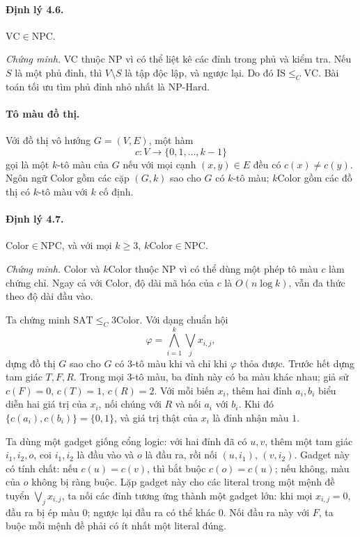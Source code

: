 \documentclass[11pt]{article}
\begin{document}
\paragraph{Định lý 4.6.}
\(\mathrm{VC}\in\mathrm{NPC}\).

\emph{Chứng minh.}
VC thuộc NP vì có thể liệt kê các đỉnh trong phủ và kiểm tra. Nếu \(S\) là một
phủ đỉnh, thì \(V\setminus S\) là tập độc lập, và ngược lại. Do đó
\(\mathrm{IS}\le_C\mathrm{VC}\). Bài toán tối ưu tìm phủ đỉnh nhỏ nhất là
NP-Hard.

\paragraph{Tô màu đồ thị.}
Với đồ thị vô hướng \(G=(V,E)\), một hàm
\[
  c:V\to\{0,1,\ldots,k-1\}
\]
gọi là một \(k\)-tô màu của \(G\) nếu với mọi cạnh \((x,y)\in E\) đều có
\(c(x)\ne c(y)\). Ngôn ngữ Color gồm các cặp \((G,k)\) sao cho \(G\) có
\(k\)-tô màu; \(k\)Color gồm các đồ thị có \(k\)-tô màu với \(k\) cố định.

\paragraph{Định lý 4.7.}
\(\mathrm{Color}\in\mathrm{NPC}\), và với mọi \(k\ge3\),
\(k\mathrm{Color}\in\mathrm{NPC}\).

\emph{Chứng minh.}
Color và \(k\)Color thuộc NP vì có thể dùng một phép tô màu \(c\) làm chứng
chỉ. Ngay cả với Color, độ dài mã hóa của \(c\) là \(O(n\log k)\), vẫn đa thức
theo độ dài đầu vào.

Ta chứng minh \(\mathrm{SAT}\le_C 3\mathrm{Color}\). Với dạng chuẩn hội
\[
  \varphi=\bigwedge_{i=1}^{k}\bigvee_j x_{i,j},
\]
dựng đồ thị \(G\) sao cho \(G\) có 3-tô màu khi và chỉ khi \(\varphi\) thỏa
được. Trước hết dựng tam giác \(T,F,R\). Trong mọi 3-tô màu, ba đỉnh này có ba
màu khác nhau; giả sử \(c(F)=0\), \(c(T)=1\), \(c(R)=2\). Với mỗi biến \(x_i\),
thêm hai đỉnh \(a_i,b_i\) biểu diễn hai giá trị của \(x_i\), nối chúng với
\(R\) và nối \(a_i\) với \(b_i\). Khi đó \(\{c(a_i),c(b_i)\}=\{0,1\}\), và giá
trị thật của \(x_i\) là đỉnh nhận màu \(1\).

Ta dùng một gadget giống cổng logic: với hai đỉnh đã có \(u,v\), thêm một tam
giác \(i_1,i_2,o\), coi \(i_1,i_2\) là đầu vào và \(o\) là đầu ra, rồi nối
\((u,i_1)\), \((v,i_2)\). Gadget này có tính chất: nếu \(c(u)=c(v)\), thì bắt
buộc \(c(o)=c(u)\); nếu không, màu của \(o\) không bị ràng buộc. Lặp gadget này
cho các literal trong một mệnh đề tuyển \(\bigvee_j x_{i,j}\), ta nối các đỉnh
tương ứng thành một gadget lớn: khi mọi \(x_{i,j}=0\), đầu ra bị ép màu \(0\);
ngược lại đầu ra có thể khác \(0\). Nối đầu ra này với \(F\), ta buộc mỗi mệnh
đề phải có ít nhất một literal đúng.
\end{document}
